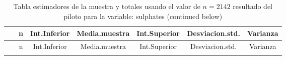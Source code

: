 \documentclass[
]{article}
\begin{document}
\begin{longtable}[]{@{}ccccccc@{}}
\caption{Tabla estimadores de la muestra y totales usando el valor de
\(n = 2142\) resultado del piloto para la variable: sulphates (continued
below)}\tabularnewline
\toprule
\begin{minipage}[b]{0.20\columnwidth}\centering
~\strut
\end{minipage} & \begin{minipage}[b]{0.05\columnwidth}\centering
n\strut
\end{minipage} & \begin{minipage}[b]{0.11\columnwidth}\centering
Int.Inferior\strut
\end{minipage} & \begin{minipage}[b]{0.12\columnwidth}\centering
Media.muestra\strut
\end{minipage} & \begin{minipage}[b]{0.11\columnwidth}\centering
Int.Superior\strut
\end{minipage} & \begin{minipage}[b]{0.13\columnwidth}\centering
Desviacion.std.\strut
\end{minipage} & \begin{minipage}[b]{0.09\columnwidth}\centering
Varianza\strut
\end{minipage}\tabularnewline
\midrule
\endfirsthead
\toprule
\begin{minipage}[b]{0.20\columnwidth}\centering
~\strut
\end{minipage} & \begin{minipage}[b]{0.05\columnwidth}\centering
n\strut
\end{minipage} & \begin{minipage}[b]{0.11\columnwidth}\centering
Int.Inferior\strut
\end{minipage} & \begin{minipage}[b]{0.12\columnwidth}\centering
Media.muestra\strut
\end{minipage} & \begin{minipage}[b]{0.11\columnwidth}\centering
Int.Superior\strut
\end{minipage} & \begin{minipage}[b]{0.13\columnwidth}\centering
Desviacion.std.\strut
\end{minipage} & \begin{minipage}[b]{0.09\columnwidth}\centering
Varianza\strut
\end{minipage}\tabularnewline
\midrule
\endhead
\begin{minipage}[t]{0.20\columnwidth}\centering

\end{minipage}
\end{longtable}
\end{document}
